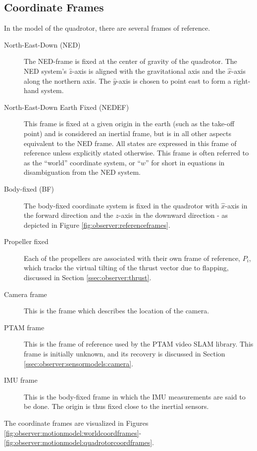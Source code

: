     \subsection{Coordinate Frames}
        In the model of the quadrotor, there are several frames of reference.
        \begin{description}
            \item[North-East-Down (NED)]
            The NED-frame is fixed at the center of gravity of the quadrotor.
            The NED system's $\hat{z}$-axis is aligned with the gravitational axis and
            the $\hat{x}$-axis along the northern axis.
            The $\hat{y}$-axis is chosen to point east to form a right-hand system.

            \item[North-East-Down Earth Fixed (NEDEF)] This frame is fixed at
            a given origin in the earth (such as the take-off point) and is
            considered an inertial frame, but is in all
            other aspects equivalent to the NED frame.
            All states are expressed in this frame of reference unless explicitly stated otherwise.
            This frame is often referred to as the ``world'' coordinate system,
            or ``$w$'' for short in equations in disambiguation from the NED system.

            \item[Body-fixed (BF)] The body-fixed coordinate system is fixed in the
            quadrotor with $\hat{x}$-axis in the forward direction and the $z$-axis in the downward
            direction - as depicted in Figure \ref{fig:observer:referenceframes}.

            \item[Propeller fixed] Each of the propellers are associated
            with their own frame of reference, $P_{i}$, which tracks the
            virtual tilting of the thrust vector due to flapping,
            discussed in Section \ref{ssec:observer:thrust}.

            \item[Camera frame] This is the frame which describes the
            location of the camera.

            \item[PTAM frame] This is the frame of reference used by the PTAM video SLAM library.
            This frame is initially unknown, and its recovery is discussed in Section \ref{ssec:observer:sensormodels:camera}.

            \item[IMU frame] This is the body-fixed frame in which the IMU measurements are said
            to be done. The origin is thus fixed close to the inertial sensors.
        \end{description}
        The coordinate frames are visualized in Figures \ref{fig:observer:motionmodel:worldcoordframes}-\ref{fig:observer:motionmodel:quadrotorcoordframes}.

